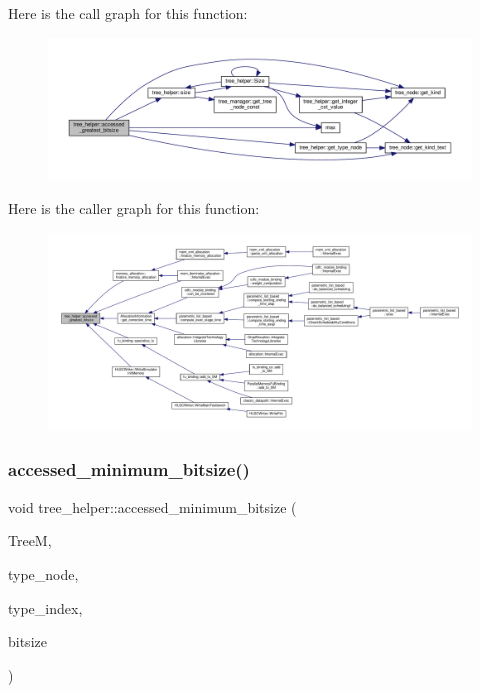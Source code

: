 Here is the call graph for this function\+:
\nopagebreak
\begin{figure}[H]
\begin{center}
\leavevmode
\includegraphics[width=350pt]{d7/d99/classtree__helper_a4bb90d532741ab00cea548b765e0f420_cgraph}
\end{center}
\end{figure}
Here is the caller graph for this function\+:
\nopagebreak
\begin{figure}[H]
\begin{center}
\leavevmode
\includegraphics[width=350pt]{d7/d99/classtree__helper_a4bb90d532741ab00cea548b765e0f420_icgraph}
\end{center}
\end{figure}
\mbox{\label{classtree__helper_adc5caf4fcc334a09a633086e5efca1f3}} 
\subsubsection{\texorpdfstring{accessed\+\_\+minimum\+\_\+bitsize()}{accessed\_minimum\_bitsize()}}
{\footnotesize\ttfamily void tree\+\_\+helper\+::accessed\+\_\+minimum\+\_\+bitsize (\begin{DoxyParamCaption}\item[{const \hyperlink{tree__manager_8hpp_a792e3f1f892d7d997a8d8a4a12e39346}{tree\+\_\+manager\+Const\+Ref} \&}]{TreeM,  }\item[{const \hyperlink{tree__node_8hpp_a6ee377554d1c4871ad66a337eaa67fd5}{tree\+\_\+node\+Ref} \&}]{type\+\_\+node,  }\item[{unsigned int}]{type\+\_\+index,  }\item[{unsigned int \&}]{bitsize }\end{DoxyParamCaption})\hspace{0.3cm}{\ttfamily [static]}}



